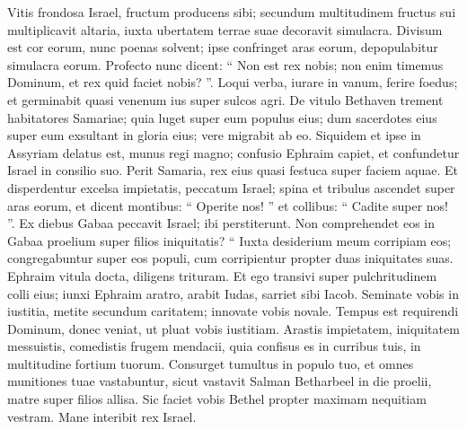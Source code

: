 \begin{biblechapter}
\begin{biblechapter}
\begin{biblechapter}
\begin{biblechapter}
\begin{biblechapter}
\begin{biblechapter}
\begin{biblechapter}
\begin{biblechapter}
\begin{biblechapter}
\begin{biblechapter}
 \verse Vitis frondosa Israel,
 fructum producens sibi;
 secundum multitudinem fructus sui multiplicavit altaria,
 iuxta ubertatem terrae suae
 decoravit simulacra.
 \verse Divisum est cor eorum,
 nunc poenas solvent;
 ipse confringet aras eorum,
 depopulabitur simulacra eorum.
 \verse Profecto nunc dicent:
 “ Non est rex nobis;
 non enim timemus Dominum,
 et rex quid faciet nobis? ”.
 \verse Loqui verba, iurare in vanum,
 ferire foedus;
 et germinabit quasi venenum ius
 super sulcos agri.
 \verse De vitulo Bethaven
 trement habitatores Samariae;
 quia luget super eum populus eius;
 dum sacerdotes eius super eum
 exsultant in gloria eius;
 vere migrabit ab eo.
 \verse Siquidem et ipse in Assyriam delatus est,
 munus regi magno;
 confusio Ephraim capiet,
 et confundetur Israel in consilio suo.
 \verse Perit Samaria,
 rex eius quasi festuca super faciem aquae.
 \verse Et disperdentur excelsa impietatis,
 peccatum Israel;
 spina et tribulus ascendet
 super aras eorum,
 et dicent montibus: “ Operite nos! ”
 et collibus: “ Cadite super nos! ”.
 \verse Ex diebus Gabaa peccavit Israel;
 ibi perstiterunt.
 Non comprehendet eos in Gabaa
 proelium super filios iniquitatis?
 \verse “ Iuxta desiderium meum corripiam eos;
 congregabuntur super eos populi,
 cum corripientur propter duas iniquitates suas.
 \verse Ephraim vitula docta,
 diligens trituram.
 Et ego transivi super pulchritudinem colli eius;
 iunxi Ephraim aratro,
 arabit Iudas,
 sarriet sibi Iacob.
 \verse Seminate vobis in iustitia,
 metite secundum caritatem;
 innovate vobis novale.
 Tempus est requirendi Dominum,
 donec veniat, ut pluat vobis iustitiam.
 \verse Arastis impietatem,
 iniquitatem messuistis,
 comedistis frugem mendacii,
 quia confisus es in curribus tuis,
 in multitudine fortium tuorum.
 \verse Consurget tumultus in populo tuo,
 et omnes munitiones tuae vastabuntur,
 sicut vastavit Salman Betharbeel
 in die proelii,
 matre super filios allisa.
 \verse Sic faciet vobis Bethel
 propter maximam nequitiam vestram.
 Mane interibit rex Israel.
 

\end{biblechapter}
\end{biblechapter}
\end{biblechapter}
\end{biblechapter}
\end{biblechapter}
\end{biblechapter}
\end{biblechapter}
\end{biblechapter}
\end{biblechapter}
\end{biblechapter}
